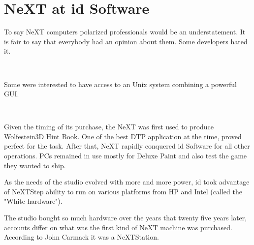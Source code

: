 \section{NeXT at id Software}
To say NeXT computers polarized professionals would be an understatement. It is fair to say that everybody had an opinion about them. Some developers hated it.\\
\par
{}\\
\par
Some were interested to have access to an Unix system combining a powerful GUI.\\
\par
{}\\
\par
Given the timing of its purchase, the NeXT was first used to produce Wolfestein3D Hint Book. One of the best DTP application at the time,  proved perfect for the task. After that, NeXT rapidly conquered id Software for all other operations. PCs remained in use mostly for Deluxe Paint and also test the game they wanted to ship.\\
\par
As the needs of the studio evolved with more and more power, id took advantage of NeXTStep ability to run on various platforms from HP and Intel (called the "White hardware").\\
\par
The studio bought so much hardware over the years that twenty five years later, accounts differ on what was the first kind of NeXT machine was purchased. According to John Carmack it was a NeXTStation.\\
\par


